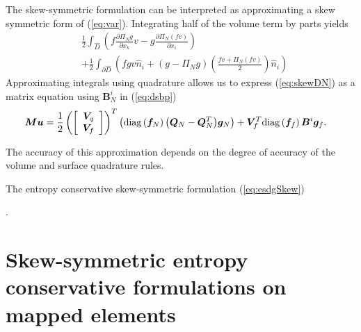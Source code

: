 \documentclass[review]{siamart0216}
\theoremstyle{assumption}
\renewcommand{\hat}[1]{\hat{#1}}
\newcommand{\pd}[2]{\frac{\partial#1}{\partial#2}}
\newcommand{\LRp}[1]{\left( #1 \right)}
\newcommand{\LRs}[1]{\left[ #1 \right]}
\renewcommand{\hat}{\widehat}
\newcommand{\note}[1]{{\color{blue}{#1}}}
\newcommand{\diag}[1]{{\rm diag}\LRp{#1}}
\begin{document}
The skew-symmetric formulation can be interpreted as approximating a skew symmetric form of (\ref{eq:var}).  Integrating half of the volume term by parts yields 
\begin{align}
&\frac{1}{2} \int_{\hat{D}} \LRp{f\pd{\Pi_N g}{x_k}v - g \pd{\Pi_N\LRp{fv}}{x_i}} \label{eq:skewDN}\\
&+\frac{1}{2} \int_{\partial \hat{D}} \LRp{fgv\hat{n}_i + \LRp{g - \Pi_Ng} \LRp{\frac{fv + \Pi_N(fv)}{2}} \hat{n}_i}\nonumber
\end{align}
Approximating integrals using quadrature allows us to express (\ref{eq:skewDN}) as a matrix equation using $\bm{B}^i_N$ in (\ref{eq:dsbp})
\begin{align*}
\bm{M}\bm{u} &= {\frac{1}{2}\LRp{\LRs{\begin{array}{c}
\bm{V}_q \\ \bm{V}_f\end{array}}}^T \LRp{\diag{\bm{f}_N}{\LRp{\bm{Q}_N-\bm{Q}_N^T}}{\bm{g}_N}} +  \bm{V}_f^T \diag{\bm{f}_f}\bm{B}^i \bm{g}_f}.
\end{align*}

The accuracy of this approximation depends on the degree of accuracy of the volume and surface quadrature rules.  

The entropy conservative skew-symmetric formulation (\ref{eq:esdgSkew})

\note{Fix this up: if IBP holds for $v\in P^M$, the approximation should be $O(h^M)$}. 


\note{Add in continuous formulation and note that skew-symmetry approximates it.}

\section{Skew-symmetric entropy conservative formulations on mapped elements}
\label{sec:skew2}
\end{document}
